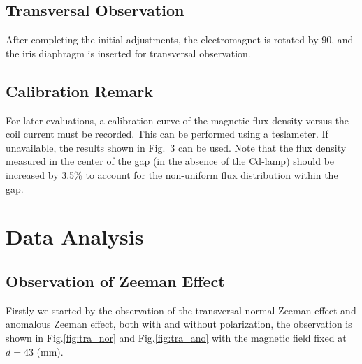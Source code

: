 \documentclass[a4paper,12pt]{article}
\begin{document}
\subsection{Transversal Observation}
    After completing the initial adjustments, the electromagnet is rotated by 90\textdegree, and the iris diaphragm is inserted for transversal observation.
    
    \subsection{Calibration Remark}
    For later evaluations, a calibration curve of the magnetic flux density versus the coil current must be recorded. This can be performed using a teslameter. If unavailable, the results shown in Fig.~3 can be used. Note that the flux density measured in the center of the gap (in the absence of the Cd-lamp) should be increased by 3.5\% to account for the non-uniform flux distribution within the gap.
    
    

    \section{Data Analysis }

    \subsection{Observation of Zeeman Effect}
    
    \par Firstly we started by the observation of the transversal normal Zeeman effect and anomalous Zeeman effect, both with and without polarization, the observation is shown in Fig.\ref{fig:tra_nor} and Fig.\ref{fig:tra_ano} with the magnetic field fixed at $d=43 $ (mm).
    
\end{document}
